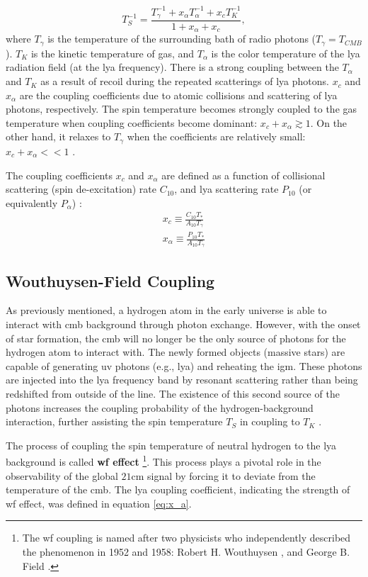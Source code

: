 \documentclass[12pt, TexShade, letterpaper]{report}
\begin{document}
\begin{equation}
    T^{-1}_S = \frac{T^{-1}_\gamma + x_\alpha T^{-1}_\alpha + x_c T^{-1}_K}{1 + x_\alpha + x_c}, \label{eq:spin_temperature_coupling}
\end{equation}
where $T_\gamma$ is the temperature of the surrounding bath of radio photons ($T_\gamma = T_{CMB}$). $T_K$ is the kinetic temperature of gas, and $T_\alpha$ is the color temperature of the \gls{lya} radiation field (at the \gls{lya} frequency). There is a strong coupling between the $T_\alpha$ and $T_K$ as a result of recoil during the repeated scatterings of \gls{lya} photons. $x_c$ and $x_\alpha$ are the coupling coefficients due to atomic collisions and scattering of \gls{lya} photons, respectively. The spin temperature becomes strongly coupled to the gas temperature when coupling coefficients become dominant: $x_c + x_\alpha \gtrsim 1$. On the other hand, it relaxes to $T_\gamma$ when the coefficients are relatively small: $x_c + x_\alpha << 1$ \cite{21century, low_frequency}. \par
The coupling coefficients $x_c$ and $x_\alpha$ are defined as a function of collisional scattering (spin de-excitation) rate $C_{10}$, and \gls{lya} scattering rate $P_{10}$ (or equivalently $P_\alpha$) \cite{explore_cosmic_dawn, low_frequency}:
\begin{gather}
    x_c \equiv \frac{C_{10}T_*}{A_{10}T_\gamma}\\
    x_\alpha \equiv \frac{P_{10} T_*}{A_{10}T_\gamma} \label{eq:x_a}
\end{gather}
\subsection{Wouthuysen-Field Coupling}
As previously mentioned, a hydrogen atom in the early universe is able to interact with \gls{cmb} background through photon exchange. However, with the onset of star formation, the \gls{cmb} will no longer be the only source of photons for the hydrogen atom to interact with. The newly formed objects (massive stars) are capable of generating \gls{uv} photons (e.g., \gls{lya}) and reheating the \gls{igm}. These photons are injected into the \gls{lya} frequency band by resonant scattering rather than being redshifted from outside of the line. The existence of this second source of the photons increases the coupling probability of the hydrogen-background interaction, further assisting the spin temperature $T_S$ in coupling to $T_K$ \cite{21century, low_frequency}.\par
The process of coupling the spin temperature of neutral hydrogen to the \gls{lya} background is called \textbf{\gls{wf} effect} \cite{barkana2001beginning}\footnote{The \gls{wf} coupling is named after two physicists who independently described the phenomenon in 1952 and 1958: Robert H. Wouthuysen \cite{wouthuysen_original}, and George B. Field \cite{field_original}.}. This process plays a pivotal role in the observability of the global $\mathrm{21cm}$ signal by forcing it to deviate from the temperature of the \gls{cmb}. The \gls{lya} coupling coefficient, indicating the strength of \gls{wf} effect, was defined in equation \ref{eq:x_a}. \par
\end{document}
